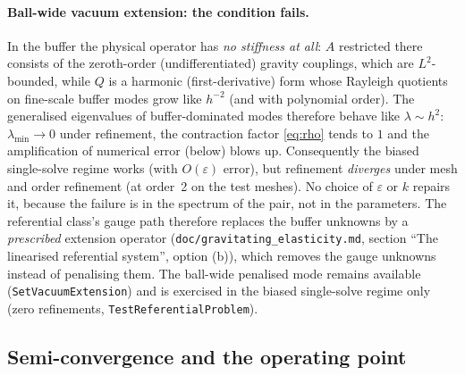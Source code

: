 \documentclass[11pt]{article}
\newcommand{\eps}{\varepsilon}
\begin{document}
\paragraph{Ball-wide vacuum extension: the condition fails.}
In the buffer the physical operator has \emph{no stiffness at all}:
$A$ restricted there consists of the zeroth-order (undifferentiated)
gravity couplings, which are $L^{2}$-bounded, while $Q$ is a harmonic
(first-derivative) form whose Rayleigh quotients on fine-scale buffer
modes grow like $h^{-2}$ (and with polynomial order). The generalised
eigenvalues of buffer-dominated modes therefore behave like
$\lambda \sim h^{2}$: $\lambda_{\min} \to 0$ under refinement, the
contraction factor \eqref{eq:rho} tends to $1$ and the amplification of
numerical error (below) blows up. Consequently the biased single-solve
regime works (with $O(\eps)$ error), but refinement \emph{diverges}
under mesh and order refinement (at order~2 on the test meshes). No
choice of $\eps$ or $k$ repairs it, because the failure is in the
spectrum of the pair, not in the parameters. The referential
class's gauge path therefore replaces the buffer unknowns by a \emph{prescribed}
extension operator (\texttt{doc/gravitating\_elasticity.md}, section
``The linearised referential system'', option (b)), which removes the
gauge unknowns instead of penalising them. The ball-wide penalised mode
remains available (\texttt{SetVacuumExtension}) and is exercised in the
biased single-solve regime only (zero refinements, \texttt{TestReferentialProblem}).

\subsection{Semi-convergence and the operating point}
\label{sec:semiconv}
\end{document}
